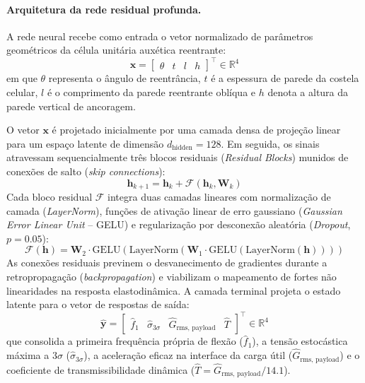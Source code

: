 \paragraph{Arquitetura da rede residual profunda.}
\label{par:arquitetura}
A rede neural recebe como entrada o vetor normalizado de parâmetros geométricos da célula unitária auxética reentrante:
\begin{equation}
  \mathbf{x} = \begin{bmatrix} \theta & t & l & h \end{bmatrix}^{\top} \in \mathbb{R}^{4}
  \label{eq:entrada}
\end{equation}
em que $\theta$ representa o ângulo de reentrância, $t$ é a espessura de parede da costela celular, $l$ é o comprimento da parede reentrante oblíqua e $h$ denota a altura da parede vertical de ancoragem.

O vetor $\mathbf{x}$ é projetado inicialmente por uma camada densa de projeção linear para um espaço latente de dimensão $d_{\text{hidden}} = 128$. Em seguida, os sinais atravessam sequencialmente três blocos residuais (\textit{Residual Blocks}) munidos de conexões de salto (\textit{skip connections}):
\begin{equation}
  \mathbf{h}_{k+1} = \mathbf{h}_k + \mathcal{F}(\mathbf{h}_k, \mathbf{W}_k)
  \label{eq:residual}
\end{equation}
Cada bloco residual $\mathcal{F}$ integra duas camadas lineares com normalização de camada (\textit{LayerNorm}), funções de ativação linear de erro gaussiano (\textit{Gaussian Error Linear Unit} -- GELU) e regularização por desconexão aleatória (\textit{Dropout}, $p = \num{0.05}$):
\begin{equation}
  \mathcal{F}(\mathbf{h}) = \mathbf{W}_2 \cdot \mathrm{GELU}\!\left( \mathrm{LayerNorm}\!\left( \mathbf{W}_1 \cdot \mathrm{GELU}\!\left( \mathrm{LayerNorm}(\mathbf{h}) \right) \right) \right)
  \label{eq:bloco}
\end{equation}
As conexões residuais previnem o desvanecimento de gradientes durante a retropropagação (\textit{backpropagation}) e viabilizam o mapeamento de fortes não linearidades na resposta elastodinâmica. A camada terminal projeta o estado latente para o vetor de respostas de saída:
\begin{equation}
  \hat{\mathbf{y}} = \begin{bmatrix} \hat{f}_1 & \hat{\sigma}_{3\sigma} & \hat{G}_{\text{rms, payload}} & \hat{T} \end{bmatrix}^{\top} \in \mathbb{R}^{4}
  \label{eq:saida}
\end{equation}
que consolida a primeira frequência própria de flexão ($\hat{f}_1$), a tensão estocástica máxima a $3\sigma$ ($\hat{\sigma}_{3\sigma}$), a aceleração eficaz na interface da carga útil ($\hat{G}_{\text{rms, payload}}$) e o coeficiente de transmissibilidade dinâmica ($\hat{T} = \hat{G}_{\text{rms, payload}} / \num{14.1}$).

